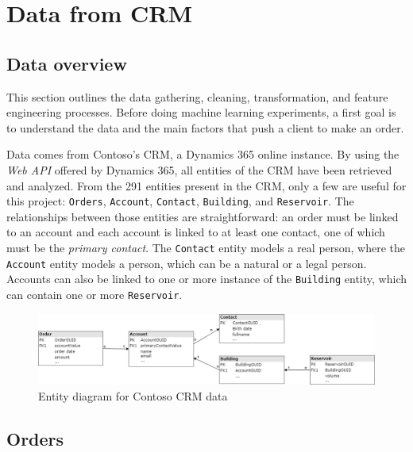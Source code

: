 \section{Data from CRM} \label{sec:crm-data}

\subsection{Data overview}
This section outlines the data gathering, cleaning, transformation, and feature engineering processes. Before doing machine learning experiments, a first goal is to understand the data and the main factors that push a client to make an order. 

Data comes from Contoso's CRM, a Dynamics 365 online instance. By using the \textit{Web API} offered by Dynamics 365, all entities of the CRM have been retrieved and analyzed. From the 291 entities present in the CRM, only a few are useful for this project: \texttt{Orders}, \texttt{Account}, \texttt{Contact}, \texttt{Building}, and \texttt{Reservoir}. The relationships between those entities are straightforward: an order must be linked to an account and each account is linked to at least one contact, one of which must be the \textit{primary contact}. The \texttt{Contact} entity models a real person, where the \texttt{Account} entity models a person, which can be a natural or a legal person. Accounts can also be linked to one or more instance of the \texttt{Building} entity, which can contain one or more \texttt{Reservoir}.

\begin{figure}[h]
    \centering
    \includegraphics[width=12cm]{images/entityDiagram.png}
    \caption[Entity diagram of the CRM data]{Entity diagram for Contoso CRM data}
    \label{fig:entity-diagram}
\end{figure}

\subsection{Orders}\label{sec:crm-orders}

